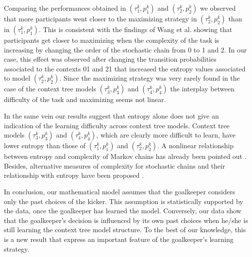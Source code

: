 \documentclass[fleqn,10pt]{wlscirep}
\begin{document}
Comparing the performances obtained in $(\tau^k_1, p^k_1)$ and $(\tau^k_2, p^k_2)$ we observed that more participants went closer to the maximizing strategy in $(\tau^k_2, p^k_2)$ than in $(\tau^k_1, p^k_1)$. This is consistent with the findings of Wang et al. \cite{wang_learning_2017} showing that participants get closer to maximizing when the complexity of the task is increasing by changing the order of the stochastic chain from 0 to 1 and 2. In our case, this effect was observed after changing the transition probabilities associated to the contexts 01 and 21 that increased the entropy values associated to model $(\tau^k_2, p^k_2)$. Since the maximizing strategy was very rarely found in the case of the context tree models $(\tau^k_3, p^k_3)$ and $(\tau^k_4, p^k_4)$ the interplay between difficulty of the task and maximizing seems not linear. 


In the same vein our results suggest that entropy alone does not give an indication of the learning difficulty across context tree models. Context tree models $(\tau^k_3, p^k_3)$ and $(\tau^k_4, p^k_4)$, which are clearly more difficult to learn, have lower entropy than those of $(\tau^k_1, p^k_1)$ and $(\tau^k_2, p^k_2)$. A nonlinear relationship between entropy and complexity of Markov chains has already been pointed out \cite{Li1991}. Besides, alternative measures of complexity for stochastic chains and their relationship with entropy have been proposed \cite{Grassberger:1986, Bialek:2001}.        
   

In conclusion, our mathematical model assumes that the goalkeeper considers only the past choices of the kicker. This assumption is statistically supported by the data, once the goalkeeper has learned the model. Conversely, our data show that the goalkeeper's decision is influenced by its own past choices when he/she is still learning the context tree model structure. To the best of our knowledge, this is a new result that express an important feature of the goalkeeper's learning strategy.   
\end{document}
